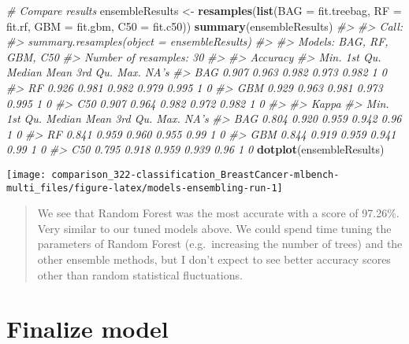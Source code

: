 \documentclass[]{book}
\newenvironment{Shaded}{\begin{snugshade}}{\end{snugshade}}
\newcommand{\CommentTok}[1]{\textcolor[rgb]{0.56,0.35,0.01}{\textit{#1}}}
\newcommand{\DataTypeTok}[1]{\textcolor[rgb]{0.13,0.29,0.53}{#1}}
\newcommand{\KeywordTok}[1]{\textcolor[rgb]{0.13,0.29,0.53}{\textbf{#1}}}
\newcommand{\NormalTok}[1]{#1}
\newcommand{\StringTok}[1]{\textcolor[rgb]{0.31,0.60,0.02}{#1}}
\begin{document}
\begin{Shaded}
\begin{Highlighting}[]
\CommentTok{# Compare results}
\NormalTok{ensembleResults <-}\StringTok{ }\KeywordTok{resamples}\NormalTok{(}\KeywordTok{list}\NormalTok{(}\DataTypeTok{BAG =}\NormalTok{ fit.treebag, }
                                  \DataTypeTok{RF  =}\NormalTok{ fit.rf, }
                                  \DataTypeTok{GBM =}\NormalTok{ fit.gbm, }
                                  \DataTypeTok{C50 =}\NormalTok{ fit.c50))}
\KeywordTok{summary}\NormalTok{(ensembleResults)}
\CommentTok{#> }
\CommentTok{#> Call:}
\CommentTok{#> summary.resamples(object = ensembleResults)}
\CommentTok{#> }
\CommentTok{#> Models: BAG, RF, GBM, C50 }
\CommentTok{#> Number of resamples: 30 }
\CommentTok{#> }
\CommentTok{#> Accuracy }
\CommentTok{#>      Min. 1st Qu. Median  Mean 3rd Qu. Max. NA's}
\CommentTok{#> BAG 0.907   0.963  0.982 0.973   0.982    1    0}
\CommentTok{#> RF  0.926   0.981  0.982 0.979   0.995    1    0}
\CommentTok{#> GBM 0.929   0.963  0.981 0.973   0.995    1    0}
\CommentTok{#> C50 0.907   0.964  0.982 0.972   0.982    1    0}
\CommentTok{#> }
\CommentTok{#> Kappa }
\CommentTok{#>      Min. 1st Qu. Median  Mean 3rd Qu. Max. NA's}
\CommentTok{#> BAG 0.804   0.920  0.959 0.942    0.96    1    0}
\CommentTok{#> RF  0.841   0.959  0.960 0.955    0.99    1    0}
\CommentTok{#> GBM 0.844   0.919  0.959 0.941    0.99    1    0}
\CommentTok{#> C50 0.795   0.918  0.959 0.939    0.96    1    0}
\KeywordTok{dotplot}\NormalTok{(ensembleResults)}
\end{Highlighting}
\end{Shaded}

\begin{center}\texttt{[image: comparison\_322-classification\_BreastCancer-mlbench-multi\_files/figure-latex/models-ensembling-run-1]} \end{center}

\begin{quote}
We see that Random Forest was the most accurate with a score of 97.26\%. Very similar to our tuned models above. We could spend time tuning the parameters of Random Forest (e.g.~increasing the number of trees) and the other ensemble methods, but I don't expect to see better accuracy scores other than random statistical ﬂuctuations.
\end{quote}

\hypertarget{finalize-model}{%
\section{Finalize model}\label{finalize-model}}
\end{document}
